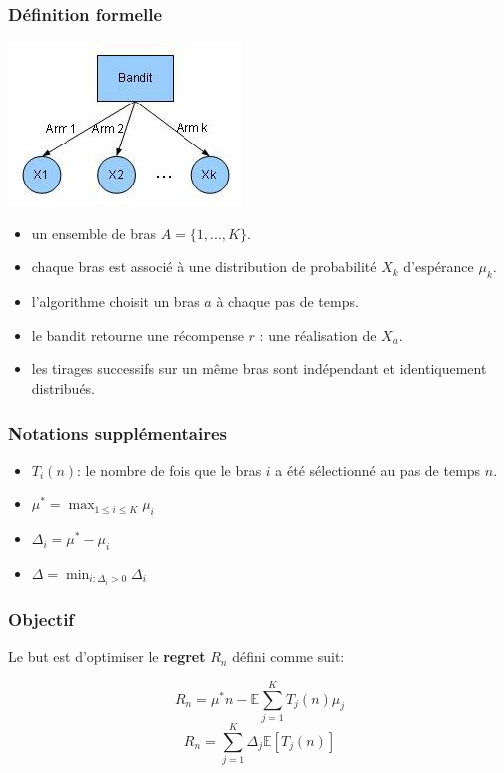 \documentclass[compress, color = usenames, dvipsnames]{beamer}
\begin{document}
\begin{frame}
    \frametitle{Définition formelle}
    \begin{center}
        \includegraphics[scale=0.5]{figs/bandit.jpg}
    \end{center}
    \begin{itemize}
        \item un ensemble de bras $A=\{1,...,K\}$.
        \item chaque bras est associé à une distribution de probabilité $X_k$ d'espérance $\mu_k$.
        \item l'algorithme choisit un bras $a$ à chaque pas de temps.
        \item le bandit retourne une récompense $r$ : une réalisation de $X_a$.
        \item les tirages successifs sur un même bras sont indépendant et identiquement distribués.
    \end{itemize}
\end{frame}



\begin{frame}
    \frametitle{Notations supplémentaires}
    \begin{itemize}
        \item $T_i(n)$: le nombre de fois que le bras $i$ a été sélectionné au pas de temps $n$.
        \item $\mu^* = \max_{1 \le i \le K}\mu_i$
        \item $\Delta_i = \mu^* - \mu_i$ 
        \item $\Delta = \min_{i:\Delta_i > 0}\Delta_i$
    \end{itemize}


\end{frame}


\begin{frame}
    \frametitle{Objectif}

    Le but est d'optimiser le \textbf{regret} $R_n$ défini comme suit:

    $$R_n=\mu^*n - \mathbb{E} \sum_{j=1}^{K}  T_j(n) \mu_j$$
    $$R_n=\sum_{j=1}^{K} \Delta_j \mathbb{E} [T_j(n)]$$

\end{frame}
\end{document}
